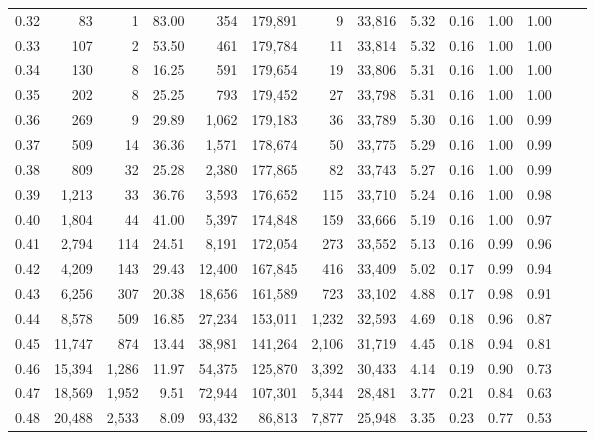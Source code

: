 \begin{tabular}{rrrrrrrrrrrrrr}
0.32 &      83 &      1 &   83.00 &      354 &  179,891 &       9 &  33,816 &  5.32 &  0.16 &  1.00 &      1.00 \\
0.33 &     107 &      2 &   53.50 &      461 &  179,784 &      11 &  33,814 &  5.32 &  0.16 &  1.00 &      1.00 \\
0.34 &     130 &      8 &   16.25 &      591 &  179,654 &      19 &  33,806 &  5.31 &  0.16 &  1.00 &      1.00 \\
0.35 &     202 &      8 &   25.25 &      793 &  179,452 &      27 &  33,798 &  5.31 &  0.16 &  1.00 &      1.00 \\
0.36 &     269 &      9 &   29.89 &    1,062 &  179,183 &      36 &  33,789 &  5.30 &  0.16 &  1.00 &      0.99 \\
0.37 &     509 &     14 &   36.36 &    1,571 &  178,674 &      50 &  33,775 &  5.29 &  0.16 &  1.00 &      0.99 \\
0.38 &     809 &     32 &   25.28 &    2,380 &  177,865 &      82 &  33,743 &  5.27 &  0.16 &  1.00 &      0.99 \\
0.39 &   1,213 &     33 &   36.76 &    3,593 &  176,652 &     115 &  33,710 &  5.24 &  0.16 &  1.00 &      0.98 \\
0.40 &   1,804 &     44 &   41.00 &    5,397 &  174,848 &     159 &  33,666 &  5.19 &  0.16 &  1.00 &      0.97 \\
0.41 &   2,794 &    114 &   24.51 &    8,191 &  172,054 &     273 &  33,552 &  5.13 &  0.16 &  0.99 &      0.96 \\
0.42 &   4,209 &    143 &   29.43 &   12,400 &  167,845 &     416 &  33,409 &  5.02 &  0.17 &  0.99 &      0.94 \\
0.43 &   6,256 &    307 &   20.38 &   18,656 &  161,589 &     723 &  33,102 &  4.88 &  0.17 &  0.98 &      0.91 \\
0.44 &   8,578 &    509 &   16.85 &   27,234 &  153,011 &   1,232 &  32,593 &  4.69 &  0.18 &  0.96 &      0.87 \\
0.45 &  11,747 &    874 &   13.44 &   38,981 &  141,264 &   2,106 &  31,719 &  4.45 &  0.18 &  0.94 &      0.81 \\
0.46 &  15,394 &  1,286 &   11.97 &   54,375 &  125,870 &   3,392 &  30,433 &  4.14 &  0.19 &  0.90 &      0.73 \\
0.47 &  18,569 &  1,952 &    9.51 &   72,944 &  107,301 &   5,344 &  28,481 &  3.77 &  0.21 &  0.84 &      0.63 \\
0.48 &  20,488 &  2,533 &    8.09 &   93,432 &   86,813 &   7,877 &  25,948 &  3.35 &  0.23 &  0.77 &      0.53 \\

\end{tabular}
